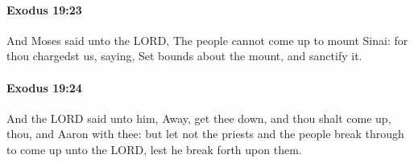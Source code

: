 		\paragraph{Exodus 19:23} %
			\label{EXODUS-19-23}

			And Moses said unto the LORD, The people cannot come up to mount Sinai: for thou chargedst us, saying, Set bounds about the mount, and sanctify it.


		\paragraph{Exodus 19:24} %
			\label{EXODUS-19-24}

			And the LORD said unto him, Away, get thee down, and thou shalt come up, thou, and Aaron with thee: but let not the priests and the people break through to come up unto the LORD, lest he break forth upon them.


